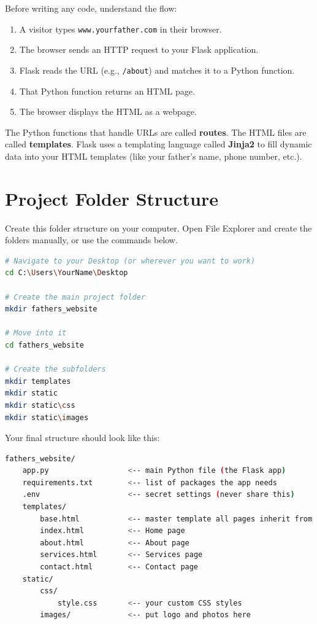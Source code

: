 \documentclass[12pt, a4paper]{book}
\begin{document}
Before writing any code, understand the flow:

\begin{enumerate}[leftmargin=1.5em]
  \item A visitor types \texttt{www.yourfather.com} in their browser.
  \item The browser sends an HTTP request to your Flask application.
  \item Flask reads the URL (e.g., \texttt{/about}) and matches it to a Python function.
  \item That Python function returns an HTML page.
  \item The browser displays the HTML as a webpage.
\end{enumerate}

The Python functions that handle URLs are called \textbf{routes}.
The HTML files are called \textbf{templates}.
Flask uses a templating language called \textbf{Jinja2} to fill dynamic data
into your HTML templates (like your father's name, phone number, etc.).

\section{Project Folder Structure}

Create this folder structure on your computer.
Open File Explorer and create the folders manually, or use the commands below.

\begin{lstlisting}[language=bash, style=bashstyle, caption={Create Project Folders}]
# Navigate to your Desktop (or wherever you want to work)
cd C:\Users\YourName\Desktop

# Create the main project folder
mkdir fathers_website

# Move into it
cd fathers_website

# Create the subfolders
mkdir templates
mkdir static
mkdir static\css
mkdir static\images
\end{lstlisting}

Your final structure should look like this:

\begin{lstlisting}[language=bash, style=bashstyle, caption={Project Structure}]
fathers_website/
    app.py                  <-- main Python file (the Flask app)
    requirements.txt        <-- list of packages the app needs
    .env                    <-- secret settings (never share this)
    templates/
        base.html           <-- master template all pages inherit from
        index.html          <-- Home page
        about.html          <-- About page
        services.html       <-- Services page
        contact.html        <-- Contact page
    static/
        css/
            style.css       <-- your custom CSS styles
        images/             <-- put logo and photos here
\end{lstlisting}
\end{document}
